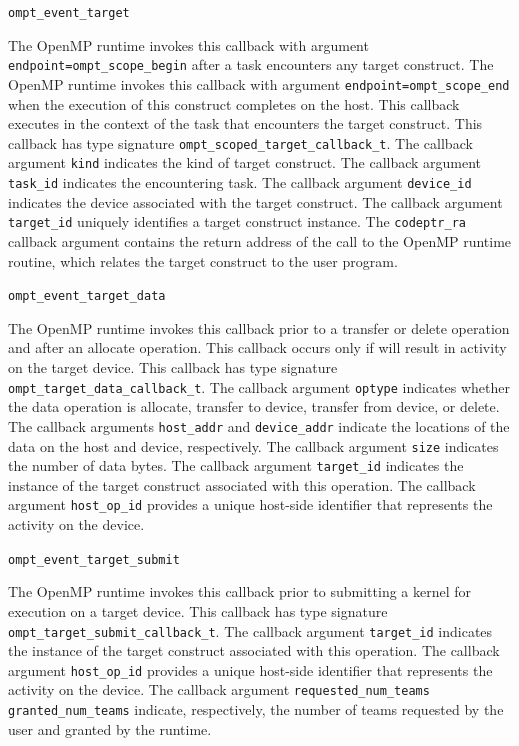 \documentclass{article}
\begin{document}
\begin{description}

\item \verb|ompt_event_target|

The OpenMP runtime invokes this callback with argument \verb|endpoint=ompt_scope_begin| after a task encounters any target construct. 
The OpenMP runtime invokes this callback with argument \verb|endpoint=ompt_scope_end| when the execution of this construct completes on the host. 
This callback executes in the context of the task that encounters the target construct.
This callback has type signature \verb|ompt_scoped_target_callback_t|.
The callback argument \verb|kind| indicates the kind of target construct.
The callback argument \verb|task_id| indicates the encountering task.
The callback argument \verb|device_id| indicates the device associated with the target  construct.
The callback argument \verb|target_id| uniquely identifies a target construct instance. 
The \verb|codeptr_ra| callback argument contains the return address of the call to the OpenMP runtime routine, which relates the target construct to the user program. 

\item \verb|ompt_event_target_data|

The OpenMP runtime invokes this callback prior to a transfer or delete operation and after an allocate operation. 
This callback occurs only if will result in activity on the target device.
This callback has type signature \verb|ompt_target_data_callback_t|.
The callback argument \verb|optype| indicates  whether the data operation is allocate, transfer to device, transfer from device, or delete.
The callback arguments \verb|host_addr| and \verb|device_addr|  indicate the locations of the data on the host and device, respectively.
The callback argument \verb|size| indicates the number of data bytes.
The callback argument \verb|target_id| indicates the instance of the target construct associated with this operation.
The callback argument \verb|host_op_id| provides a unique host-side identifier that represents the activity on the device.

\item \verb|ompt_event_target_submit|

The OpenMP runtime invokes this callback prior to submitting a kernel for execution on a target device. 
This callback has type signature \verb|ompt_target_submit_callback_t|.
The callback argument \verb|target_id| indicates the instance of the target construct associated with this operation.
The callback argument \verb|host_op_id| provides a unique host-side identifier that represents the activity on the device.
The callback argument \verb|requested_num_teams|  \verb|granted_num_teams| indicate, respectively, the number of teams requested by the user and granted by the runtime.

\end{description}
\end{document}
